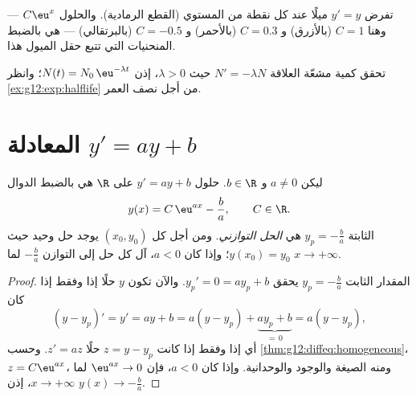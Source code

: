 \begin{omfigure}

{\small تفرض  $y' = y$ ميلًا عند كل نقطة من
المستوي (القطع الرمادية). والحلول $C\eu^{x}$ --- وهنا $C = 1$ (بالأزرق)
و $C = 0.3$ (بالأحمر) و $C = -0.5$ (بالبرتقالي) --- هي بالضبط المنحنيات التي
تتبع حقل الميول هذا.}
\end{omfigure}

\begin{example}\label{ex:g12:diffeq:decay}
تحقق كمية مشعّة العلاقة $N' = -\lambda N$ حيث $\lambda > 0$، إذن
$N(t) = N_0\,\eu^{-\lambda t}$؛ وانظر \cref{ex:g12:exp:halflife} من أجل
نصف العمر.
\end{example}

\section{المعادلة \texorpdfstring{$y' = ay + b$}{y' = ay + b}}

\begin{theorem}[حلول $y' = ay + b$]\label{thm:g12:diffeq:affine}
ليكن $a \neq 0$ و $b \in \R$. حلول  $y' = ay + b$ على $\R$ هي
بالضبط الدوال
\[
y(x) = C\,\eu^{ax} - \frac{b}{a}, \qquad C \in \R .
\]
 الثابتة $y_p = -\frac ba$ هي \emph{الحل التوازني}.
ومن أجل كل $(x_0, y_0)$ يوجد حل وحيد حيث $y(x_0) = y_0$؛ وإذا كان
$a < 0$، آل كل حل إلى التوازن $-\frac ba$ لما
$x \to +\infty$.
\end{theorem}

\begin{proof}
المقدار الثابت $y_p = -\frac{b}{a}$ يحقق $y_p' = 0 = a y_p + b$. والآن تكون $y$
حلًا إذا وفقط إذا كان
\[
(y - y_p)' = y' = ay + b = a(y - y_p) + \underbrace{a y_p + b}_{=\,0}
= a (y - y_p),
\]
أي إذا وفقط إذا كانت $z = y - y_p$ حلًا  $z' = az$. وحسب
\cref{thm:g12:diffeq:homogeneous}، $z = C\eu^{ax}$، ومنه الصيغة
والوجود والوحدانية. وإذا كان $a < 0$، فإن $\eu^{ax} \to 0$ لما
$x \to +\infty$، إذن $y(x) \to -\frac ba$.
\end{proof}


